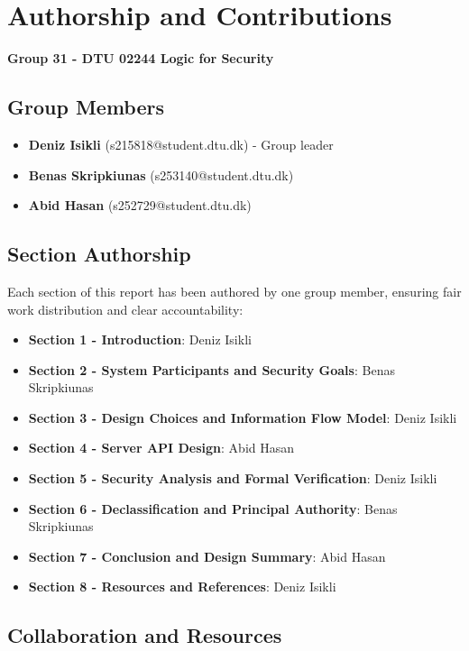\section{Authorship and Contributions}

\textbf{Group 31 - DTU 02244 Logic for Security}

\subsection{Group Members}

\begin{itemize}
    \item \textbf{Deniz Isikli} (s215818@student.dtu.dk) - Group leader
    \item \textbf{Benas Skripkiunas} (s253140@student.dtu.dk)
    \item \textbf{Abid Hasan} (s252729@student.dtu.dk)
\end{itemize}

\subsection{Section Authorship}

Each section of this report has been authored by one group member, ensuring fair work distribution and clear accountability:

\begin{itemize}
    \item \textbf{Section 1 - Introduction}: Deniz Isikli
    \item \textbf{Section 2 - System Participants and Security Goals}: Benas Skripkiunas
    \item \textbf{Section 3 - Design Choices and Information Flow Model}: Deniz Isikli
    \item \textbf{Section 4 - Server API Design}: Abid Hasan
    \item \textbf{Section 5 - Security Analysis and Formal Verification}: Deniz Isikli
    \item \textbf{Section 6 - Declassification and Principal Authority}: Benas Skripkiunas
    \item \textbf{Section 7 - Conclusion and Design Summary}: Abid Hasan
    \item \textbf{Section 8 - Resources and References}: Deniz Isikli
\end{itemize}

\subsection{Collaboration and Resources}

